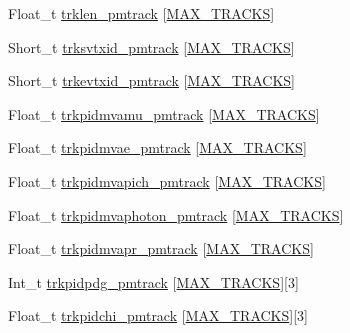 \begin{DoxyCompactItemize}
\item 
Float\-\_\-t \hyperlink{classanatree_a3aaceb331268e1053c107da3dead2769}{trklen\-\_\-pmtrack} \mbox{[}\hyperlink{anatree__core__v09410002_8h_a327fd4e796e4a0d78947524c96e4362e}{M\-A\-X\-\_\-\-T\-R\-A\-C\-K\-S}\mbox{]}
\item 
Short\-\_\-t \hyperlink{classanatree_a0fe8910856f14e542cf42c275b4fbb50}{trksvtxid\-\_\-pmtrack} \mbox{[}\hyperlink{anatree__core__v09410002_8h_a327fd4e796e4a0d78947524c96e4362e}{M\-A\-X\-\_\-\-T\-R\-A\-C\-K\-S}\mbox{]}
\item 
Short\-\_\-t \hyperlink{classanatree_a98535a6464f1d6b57ca774be9ae120fc}{trkevtxid\-\_\-pmtrack} \mbox{[}\hyperlink{anatree__core__v09410002_8h_a327fd4e796e4a0d78947524c96e4362e}{M\-A\-X\-\_\-\-T\-R\-A\-C\-K\-S}\mbox{]}
\item 
Float\-\_\-t \hyperlink{classanatree_ab5c98f63151205a8ba15f16c84ae580a}{trkpidmvamu\-\_\-pmtrack} \mbox{[}\hyperlink{anatree__core__v09410002_8h_a327fd4e796e4a0d78947524c96e4362e}{M\-A\-X\-\_\-\-T\-R\-A\-C\-K\-S}\mbox{]}
\item 
Float\-\_\-t \hyperlink{classanatree_abe142c54cea5aa72c64f9d0009427bf9}{trkpidmvae\-\_\-pmtrack} \mbox{[}\hyperlink{anatree__core__v09410002_8h_a327fd4e796e4a0d78947524c96e4362e}{M\-A\-X\-\_\-\-T\-R\-A\-C\-K\-S}\mbox{]}
\item 
Float\-\_\-t \hyperlink{classanatree_a19b43d87367d0bf4f363f0189c22840d}{trkpidmvapich\-\_\-pmtrack} \mbox{[}\hyperlink{anatree__core__v09410002_8h_a327fd4e796e4a0d78947524c96e4362e}{M\-A\-X\-\_\-\-T\-R\-A\-C\-K\-S}\mbox{]}
\item 
Float\-\_\-t \hyperlink{classanatree_a974e98b742c376ccfe2a3e0bd20947ba}{trkpidmvaphoton\-\_\-pmtrack} \mbox{[}\hyperlink{anatree__core__v09410002_8h_a327fd4e796e4a0d78947524c96e4362e}{M\-A\-X\-\_\-\-T\-R\-A\-C\-K\-S}\mbox{]}
\item 
Float\-\_\-t \hyperlink{classanatree_a1067b651892b2a233dda3af95404c38d}{trkpidmvapr\-\_\-pmtrack} \mbox{[}\hyperlink{anatree__core__v09410002_8h_a327fd4e796e4a0d78947524c96e4362e}{M\-A\-X\-\_\-\-T\-R\-A\-C\-K\-S}\mbox{]}
\item 
Int\-\_\-t \hyperlink{classanatree_a152ff0b86ebe43db932477e6e8c5c97e}{trkpidpdg\-\_\-pmtrack} \mbox{[}\hyperlink{anatree__core__v09410002_8h_a327fd4e796e4a0d78947524c96e4362e}{M\-A\-X\-\_\-\-T\-R\-A\-C\-K\-S}\mbox{]}\mbox{[}3\mbox{]}
\item 
Float\-\_\-t \hyperlink{classanatree_a04f235e7f567a56b9e4f57e29951f56d}{trkpidchi\-\_\-pmtrack} \mbox{[}\hyperlink{anatree__core__v09410002_8h_a327fd4e796e4a0d78947524c96e4362e}{M\-A\-X\-\_\-\-T\-R\-A\-C\-K\-S}\mbox{]}\mbox{[}3\mbox{]}

\end{DoxyCompactItemize}
